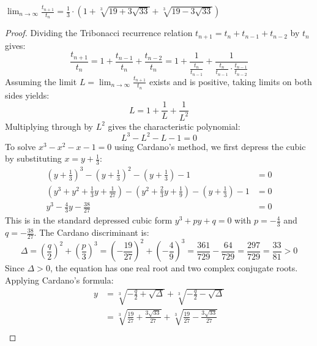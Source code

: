 \documentclass[a4paper]{article}
\begin{document}
\begin{theorem}
 $\lim_{n \to \infty} \frac{t_{n+1}}{t_{n}} = \frac{1}{3} \cdot \left( 1 + \sqrt[3]{19 + 3 \sqrt{33}} +
 \sqrt[3]{19 - 3 \sqrt{33}} \right) $

\begin{proof}
Dividing the Tribonacci recurrence relation $t_{n+1} = t_n + t_{n-1} + t_{n-2}$ by $t_n$ gives:
\begin{equation*}
\frac{t_{n+1}}{t_n} = 1 + \frac{t_{n-1}}{t_n} + \frac{t_{n-2}}{t_n} = 1 + \frac{1}{\frac{t_n}{t_{n-1}}} + \frac{1}{\frac{t_n}{t_{n-1}} \cdot \frac{t_{n-1}}{t_{n-2}}}
\end{equation*}
Assuming the limit $L = \lim_{n \to \infty} \frac{t_{n+1}}{t_n}$ exists and is positive, taking limits on both sides yields:
\begin{equation*}
L = 1 + \frac{1}{L} + \frac{1}{L^2}
\end{equation*}
Multiplying through by $L^2$ gives the characteristic polynomial:
\begin{equation*}
L^3 - L^2 - L - 1 = 0
\end{equation*}
To solve $x^3 - x^2 - x - 1 = 0$ using Cardano's method, we first depress the cubic by substituting $x = y + \frac{1}{3}$:
\begin{align*}
\left(y + \frac{1}{3}\right)^3 - \left(y + \frac{1}{3}\right)^2 - \left(y + \frac{1}{3}\right) - 1 &= 0 \\
\left(y^3 + y^2 + \frac{1}{3}y + \frac{1}{27}\right) - \left(y^2 + \frac{2}{3}y + \frac{1}{9}\right) - \left(y + \frac{1}{3}\right) - 1 &= 0 \\
y^3 - \frac{4}{3}y - \frac{38}{27} &= 0
\end{align*}
This is in the standard depressed cubic form $y^3 + py + q = 0$ with $p = -\frac{4}{3}$ and $q = -\frac{38}{27}$. The Cardano discriminant is:
\begin{equation*}
\Delta = \left(\frac{q}{2}\right)^2 + \left(\frac{p}{3}\right)^3 = \left(-\frac{19}{27}\right)^2 + \left(-\frac{4}{9}\right)^3 = \frac{361}{729} - \frac{64}{729} = \frac{297}{729} = \frac{33}{81} > 0
\end{equation*}
Since $\Delta > 0$, the equation has one real root and two complex conjugate roots. Applying Cardano's formula:
\begin{align*}
y &= \sqrt[3]{-\frac{q}{2} + \sqrt{\Delta}} + \sqrt[3]{-\frac{q}{2} - \sqrt{\Delta}} \\
  &= \sqrt[3]{\frac{19}{27} + \frac{3\sqrt{33}}{27}} + \sqrt[3]{\frac{19}{27} - \frac{3\sqrt{33}}{27}} \\

\end{align*}
\end{proof}
\end{theorem}
\end{document}
